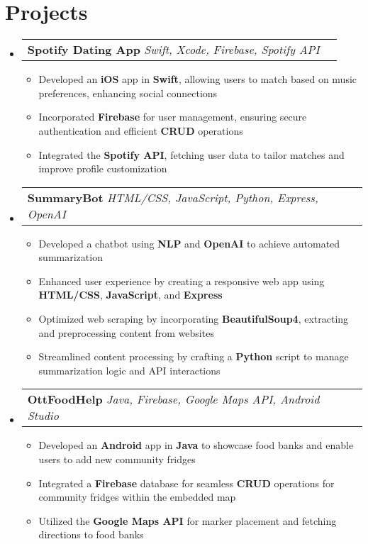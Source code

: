 \documentclass[letterpaper,11pt]{article}
\makeatletter
\newcommand{\resumeItem}[1]{
  \item\small{
    {#1 \vspace{-2pt}}
  }
}
\newcommand{\resumeSubheading}[3]{
    \item
    \begin{tabular*}{0.97\textwidth}[t]{l@{\extracolsep{\fill}}r}
      \textbf{#1} \textbar \textit{ #2} & \textbf{#3} \\
    \end{tabular*}\vspace{-4.5pt}
}
\newcommand{\resumeSubHeadingListStart}{\begin{itemize}[leftmargin=0.15in, label={}]}
\newcommand{\resumeSubHeadingListEnd}{\end{itemize}}
\newcommand{\resumeItemListStart}{\begin{itemize}}
\newcommand{\resumeItemListEnd}{\end{itemize}\vspace{-5pt}}
\makeatother
\begin{document}
\section{\textbf{\Large Projects}}
    \resumeSubHeadingListStart

        \resumeSubheading{Spotify Dating App}{Swift, Xcode, Firebase, Spotify API}{}
            \resumeItemListStart
                \resumeItem{Developed an \textbf{iOS} app in \textbf{Swift}, allowing users to match based on music preferences, enhancing social connections}
                \resumeItem{Incorporated \textbf{Firebase} for user management, ensuring secure authentication and efficient \textbf{CRUD} operations}
                \resumeItem{Integrated the \textbf{Spotify API}, fetching user data to tailor matches and improve profile customization}
            \resumeItemListEnd

        \resumeSubheading{SummaryBot}{HTML/CSS, JavaScript, Python, Express, OpenAI}{}
            \resumeItemListStart
                \resumeItem{Developed a chatbot using \textbf{NLP} and \textbf{OpenAI} to achieve automated summarization}
                \resumeItem{Enhanced user experience by creating a responsive web app using \textbf{HTML/CSS}, \textbf{JavaScript}, and \textbf{Express}}
                \resumeItem{Optimized web scraping by incorporating \textbf{BeautifulSoup4}, extracting and preprocessing content from websites}
                \resumeItem{Streamlined content processing by crafting a \textbf{Python} script to manage summarization logic and API interactions}
            \resumeItemListEnd

        \resumeSubheading{OttFoodHelp}{Java, Firebase, Google Maps API, Android Studio}{}
            \resumeItemListStart
            \resumeItem{Developed an \textbf{Android} app in \textbf{Java} to showcase food banks and enable users to add new community fridges}
            \resumeItem{Integrated a \textbf{Firebase} database for seamless \textbf{CRUD} operations for community fridges within the embedded map}
            \resumeItem{Utilized the \textbf{Google Maps API} for marker placement and fetching directions to food banks}
            \resumeItemListEnd
        \resumeSubHeadingListEnd

\end{document}
